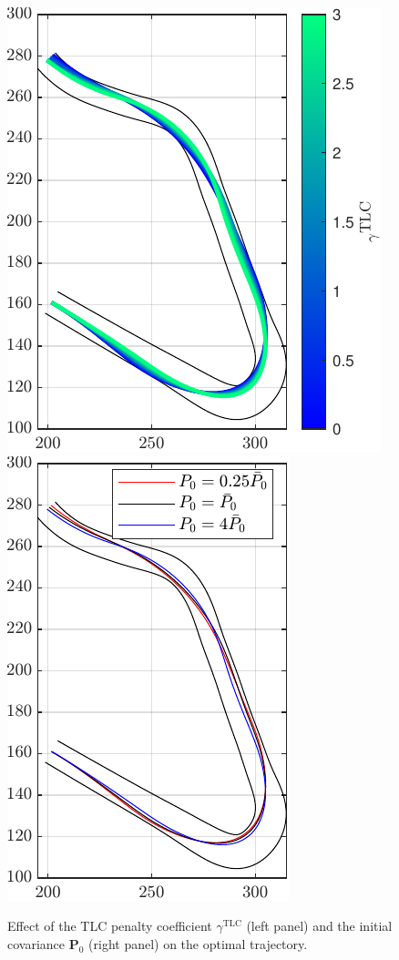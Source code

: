 \begin{figure}
	\centering
	\includegraphics{Fig/gamma_sensitivity.pdf}
	\hfill
	\includegraphics{Fig/Pzero_sensitivity.pdf}
\caption{Effect of the TLC penalty coefficient $\gamma^{\mathrm{TLC}}$ (left panel) and the initial covariance $\mathbf P_{0}$ (right panel) on the optimal trajectory.
}
\end{figure}
